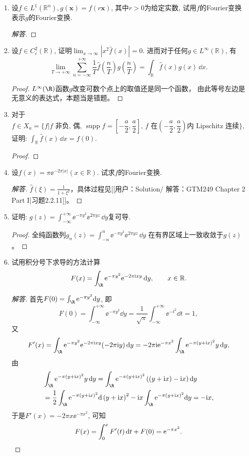 \begin{quiza}
\begin{enumerate}
\item 设\(f\in L^1(\mathbb{R}^n),g(\boldsymbol{x})=f(r\boldsymbol{x})\), 
其中\(r>0\)为给定实数, 试用\(f\)的Fourier变换表示\(g\)的Fourier变换.
\begin{proof}[解答]
	
\end{proof}
\item 设\(f\in C_c^2(\mathbb{R})\), 证明\(\lim_{x\rightarrow\infty}|x^2\widehat{f}(x)|=0\). 
进而对于任何\(g\in L^{\infty}(\mathbb{R})\), 有
\[\lim_{T\rightarrow +\infty}\sum_{n=-\infty}^{+\infty}\frac{1}{T}\widehat{f}\left(\frac{n}{T}\right)g\left(\frac{n}{T}\right)
=\int_{\mathbb{R}}\widehat{f}(x)g(x)\,\dd x.\]
\begin{proof}
	$L^\infty(\R)$函数$g$改变可数个点上的取值还是同一个函数，
    由此等号左边是无意义的表达式，本题当是错题。
\end{proof}
\item 对于\[f\in X_a=\{f\big|f\text{ 非负, 偶, }
\operatorname{supp}f=\left[-\frac{a}{2},\frac{a}{2}\right],\,f\text{ 在}\left(-\frac{a}{2},\frac{a}{2}\right)\text{内 Lipschitz 连续}\},\]
证明: \(\int_{\mathbb{R}}\widehat{f}(x)\,\dd x=f(0).\)
\begin{proof}
	
\end{proof}
\item 设\(f(x)=\pi\ee^{-2\pi |x|}(x\in\mathbb{R})\). 试求\(f\)的Fourier变换.
\begin{proof}[解答]
	\(\hat{f}(\xi)=\frac{1}{1+\xi^2}\)，具体过程见[[用户：Solution/ 解答：GTM249 Chapter 2 Part I|习题2.2.11]]。
\end{proof}
\item 证明: \(g(z)=\int_{-\infty}^{+\infty}\ee^{-\pi y^2}\ee^{2\pi yz}\,\dd y\)复可导.
\begin{proof}
	全纯函数列\(g_n(z)=\int_{-n}^{n}\ee^{-\pi y^2}\ee^{2\pi yz}\,\dd y\)
    在有界区域上一致收敛于$g(z)$。
\end{proof}
\item 试用积分号下求导的方法计算
\[F(x)=\int_{\R}\ee^{-\pi y^2}\ee^{-2\pi\mathrm{i}xy}\,\dd y,\qquad x\in\mathbb{R}.\]
\begin{proof}[解答]
	首先\(F(0)=\int_{\R}\ee^{-\pi y^2}\dd y\), 即
    \[F(0)=\int_{-\infty}^{+\infty}\ee^{-\pi y^2}\dd y
    =\frac{1}{\sqrt{\pi}}\int_{-\infty}^{+\infty}\ee^{-t^2}\dd t=1,\]
    又\[F'(x)=\int_{\R}\ee^{-\pi y^2}\ee^{-2\pi\ii xy}(-2\pi\ii y)\,\dd y
    =-2\pi\ii\ee^{-\pi x^2}\int_{\R}\ee^{-\pi(y+\ii x)^2}y\,\dd y,\]
    由\[\begin{split}
	&\int_{\R}\ee^{-\pi(y+\ii x)^2}y\,\dd y
    =\int_{\R}\ee^{-\pi(y+\ii x)^2}\left(\left(y+\ii x\right)-\ii x\right)\dd y\\
    &=\frac{1}{2}\int_{\R}\ee^{-\pi(y+\ii x)^2}\dd\left(y+\ii x\right)^2-\ii x\int_{\R}\ee^{-\pi(y+\ii x)^2}\dd y=-\ii x,
	\end{split}\]于是\(F'(x)=-2\pi x\ee^{-\pi x^2}\), 可知
    \[F(x)=\int_{0}^{x}F'(t)\,{\rm d} t+F(0)={\rm e}^{-\pi x^2}.\qedhere\]
\end{proof}
\end{enumerate}
\end{quiza}

